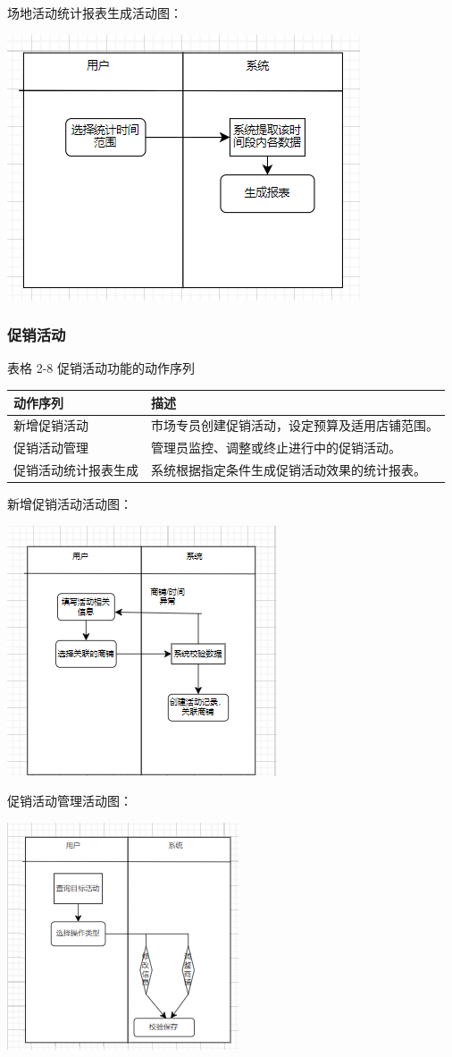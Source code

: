 \documentclass[]{article}
\let\oldincludegraphics\includegraphics
\renewcommand{\includegraphics}[2][]{%
  \begin{center}\oldincludegraphics[#1]{#2}\end{center}%
}
\begin{document}
场地活动统计报表生成活动图：
\includegraphics{media/2.5/image15.png}

\subsubsection{促销活动}

表格 2-8 促销活动功能的动作序列
\begin{longtable}[]{@{}ll@{}}
\toprule
动作序列 & 描述\tabularnewline
\midrule
\endhead
新增促销活动 & 市场专员创建促销活动，设定预算及适用店铺范围。\tabularnewline
促销活动管理 & 管理员监控、调整或终止进行中的促销活动。\tabularnewline
促销活动统计报表生成 & 系统根据指定条件生成促销活动效果的统计报表。\tabularnewline
\bottomrule
\end{longtable}

新增促销活动活动图：
\includegraphics{media/2.5/image16.png}

促销活动管理活动图：
\includegraphics{media/2.5/image17.png}
\end{document}

